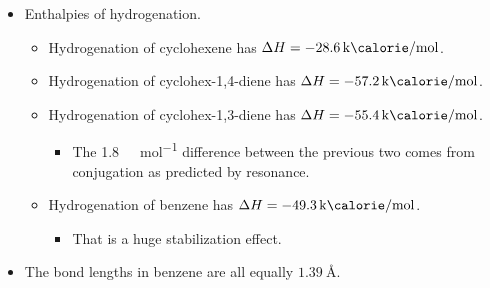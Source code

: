 \documentclass[../notes.tex]{subfiles}
\begin{document}
\begin{itemize}
\begin{itemize}
\begin{figure}[h!]
            \caption{Bromination of cyclohexatriene.}
            \label{fig:brominationCyclohexatriene}
        \end{figure}
        \begin{itemize}
            \item Evidence: You would expect bromination of cyclohexatriene to produce two products, but it only produces one (the two molecules must be rapidly interconverting, i.e., via resonance).
        \end{itemize}
        \item Chemists began looking for more similar compounds.
        \item 1911: Cyclooctatriene was made.
        \begin{itemize}
            \item It can be hydrogenated, so not consistent with the low reactivity of benzene.
        \end{itemize}
        \item Cyclobutadiene was impossible to isolate due to a self-Diels-Alder reaction at any temperature greater than \SI{-260}{\celsius}.
    \end{itemize}
    \item Enthalpies of hydrogenation.
    \begin{itemize}
        \item Hydrogenation of cyclohexene has $\Delta H=\SI[per-mode=symbol]{-28.6}{\kilo\calorie\per\mole}$.
        \item Hydrogenation of cyclohex-1,4-diene has $\Delta H=\SI[per-mode=symbol]{-57.2}{\kilo\calorie\per\mole}$.
        \item Hydrogenation of cyclohex-1,3-diene has $\Delta H=\SI[per-mode=symbol]{-55.4}{\kilo\calorie\per\mole}$.
        \begin{itemize}
            \item The \SI[per-mode=symbol]{1.8}{\kilo\calorie\per\mole} difference between the previous two comes from conjugation as predicted by resonance.
        \end{itemize}
        \item Hydrogenation of benzene has $\Delta H=\SI[per-mode=symbol]{-49.3}{\kilo\calorie\per\mole}$.
        \begin{itemize}
            \item That is a huge stabilization effect.
        \end{itemize}
    \end{itemize}
    \item The bond lengths in benzene are all equally $\SI{1.39}{\angstrom}$.

\end{itemize}
\end{document}
